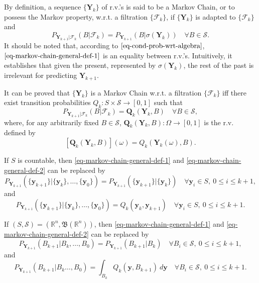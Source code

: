 By definition, a sequence $\{\mathbf{Y}_k\}$ of r.v.'s is said to be a Markov Chain, or to possess the Markov property, w.r.t. a filtration $\{\mathcal{F}_k\}$,
if $\{\mathbf{Y}_k\}$ is adapted to $\{\mathcal{F}_k\}$ and
\begin{equation}\label{eq-markov-chain-general-def-1}
P_{\mathbf{Y}_{k+1}|\mathcal{F}_k}(B|\mathcal{F}_k) = P_{\mathbf{Y}_{k+1}}(B|\sigma(\mathbf{Y}_k))\quad\forall B\in\mathcal{S}.
\end{equation}
It should be noted that, according to $\eqref{eq-cond-prob-wrt-algebra}$, $\eqref{eq-markov-chain-general-def-1}$ is an equality between r.v.'s.
Intuitively, it establishes that given the present, represented by $\sigma(\mathbf{Y}_k)$,
the rest of the past is irrelevant for predicting $\mathbf{Y}_{k+1}$.

It can be proved \cite{Du05} that $\{\mathbf{Y}_k\}$ is a Markov Chain w.r.t. a filtration $\{\mathcal{F}_k\}$ iff
there exist transition probabilities $Q_k:S\times\mathcal{S}\rightarrow [0,1]$ such that
\begin{equation}\label{eq-markov-chain-general-def-2}
P_{\mathbf{Y}_{k+1}|\mathcal{F}_k}(B|\mathcal{F}_k) = \mathbf{Q}_k(\mathbf{Y}_k,B)\quad\forall B\in\mathcal{S},
\end{equation}
where, for any arbitrarily fixed $B\in\mathcal{S}$, $\mathbf{Q}_k(\mathbf{Y}_k,B):\Omega\rightarrow [0,1]$ is the r.v. defined by
\begin{equation*}
\left[\mathbf{Q}_k(\mathbf{Y}_k,B)\right](\omega) = Q_k(\mathbf{Y}_k(\omega),B).
\end{equation*}

If $S$ is countable, then \eqref{eq-markov-chain-general-def-1} and \eqref{eq-markov-chain-general-def-2} can be replaced by
\begin{equation}\label{eq-markov-chain-countable-def-1}
P_{\mathbf{Y}_{k+1}}(
\{\mathbf{y}_{k+1}\}
|
\{\mathbf{y}_k\},
\ldots,
\{\mathbf{y}_0\}
)
=
P_{\mathbf{Y}_{k+1}}(
\{\mathbf{y}_{k+1}\}
|
\{\mathbf{y}_k\}
)
\quad\forall
\mathbf{y}_i\in S,~0\leqslant i\leqslant k+1,
\end{equation}
and
\begin{equation}\label{eq-markov-chain-countable-def-2}
P_{\mathbf{Y}_{k+1}}(
\{\mathbf{y}_{k+1}\}
|
\{\mathbf{y}_k\},
\ldots,
\{\mathbf{y}_0\}
)
=
Q_k(
\mathbf{y}_k,
\mathbf{y}_{k+1}
)
\quad\forall
\mathbf{y}_i\in S,~0\leqslant i\leqslant k+1.
\end{equation}

If $(S,\mathcal{S})=(\mathbb{R}^n,\mathfrak{B}(\mathbb{R}^n))$, then \eqref{eq-markov-chain-general-def-1} and \eqref{eq-markov-chain-general-def-2} can be replaced by
\begin{equation}\label{eq-markov-chain-R-def-1}
P_{\mathbf{Y}_{k+1}}(
B_{k+1}
|
B_k,
\ldots,
B_0
)
=
P_{\mathbf{Y}_{k+1}}(
B_{k+1}
|
B_k
)
\quad\forall
B_i\in\mathcal{S},~0\leqslant i\leqslant k+1,
\end{equation}
and
\begin{equation}\label{eq-markov-chain-R-def-2}
P_{\mathbf{Y}_{k+1}}(
B_{k+1}|
B_k
\ldots,
B_0
)
=
\int_{B_k} Q_k(
\mathbf{y},B_{k+1}
)~d\mathbf{y}
\quad\forall
B_i\in\mathcal{S},~0\leqslant i\leqslant k+1.
\end{equation}

